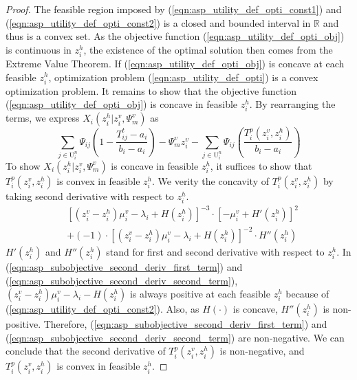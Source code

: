 \documentclass[conference]{IEEEtran}
\begin{document}
\begin{proof}
The feasible region imposed by (\ref{eqn:asp_utility_def_opti_const1}) and (\ref{eqn:asp_utility_def_opti_const2}) is a closed and bounded interval in $\mathbb{R}$ and thus is a convex set. As the objective function (\ref{eqn:asp_utility_def_opti_obj}) is continuous in $z_i^h$, the existence of the optimal solution then comes from the Extreme Value Theorem. If (\ref{eqn:asp_utility_def_opti_obj}) is concave at each feasible $z_i^h$, optimization problem (\ref{eqn:asp_utility_def_opti}) is a convex optimization problem. It remains to show that the objective function (\ref{eqn:asp_utility_def_opti_obj}) is concave in feasible $z_i^h$. By rearranging the terms, we express $X_i(z_i^h|z_i^v,\Psi_m^v)$ as
\begin{equation}
\sum_{j \in \mathrm{U}_i^n}\Psi_{ij}(1-\frac{T_{ij}^t -a_i}{b_i-a_i})- \Psi_m^v z_i^v - \sum_{j \in \mathrm{U}_i^n}\Psi_{ij}(\frac{T_i^p(z_i^v, z_i^h)}{b_i-a_i})
\end{equation}
 To show $X_i(z_i^h|z_i^v,\Psi_m^v)$ is concave in feasible $z_i^h$, it suffices to show that $T_i^p(z_i^v, z_i^h)$ is convex in feasible $z_i^h$. We verity the concavity of $T_i^p(z_i^v, z_i^h)$ by taking second derivative with respect to $z_i^h$.
\begin{subequations}\label{eqn:asp_subobjective_second_deriv}
     \begin{alignat}{1}
       &[(z_i^v- z_i^h)\mu_i^v - \lambda_i + H(z_i^h)]^{-3} \cdot [-\mu_i^v+H'(z_i^h)]^2 \label{eqn:asp_subobjective_second_deriv_first_term} \\
       &+ (-1) \cdot [(z_i^v-z_i^h)\mu_i^v - \lambda_i + H(z_i^h)]^{-2} \cdot H''(z_i^h) \label{eqn:asp_subobjective_second_deriv_second_term}
     \end{alignat}
\end{subequations}
$H'(z_i^h)$ and $H''(z_i^h)$ stand for first and second derivative with respect to $z_i^h$. In (\ref{eqn:asp_subobjective_second_deriv_first_term}) and (\ref{eqn:asp_subobjective_second_deriv_second_term}), $(z_i^v- z_i^h)\mu_i^v - \lambda_i - H(z_i^h)$ is always positive at each feasible $z_i^h$ because of (\ref{eqn:asp_utility_def_opti_const2}). Also, as $H(\cdot)$ is concave, $H''(z_i^h)$ is non-positive. Therefore, (\ref{eqn:asp_subobjective_second_deriv_first_term}) and (\ref{eqn:asp_subobjective_second_deriv_second_term}) are non-negative. We can conclude that the second derivative of $T_i^p(z_i^v, z_i^h)$ is non-negative, and $T_i^p(z_i^v, z_i^h)$ is convex in feasible $z_i^h$.
\end{proof}
\end{document}
